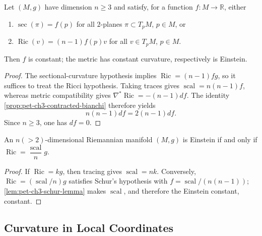\begin{lemma}
  \label{lem:pet-ch3-schur-lemma}
  \leanok
  Let $(M,g)$ have dimension $n\ge3$ and satisfy, for a function $f:M\to\mathbb
  R$, either
  \begin{enumerate}
    \item[(1)] $\sec(\pi)=f(p)$ for all $2$-planes $\pi\subset T_pM$, $p\in M$, or
    \item[(2)] $\operatorname{Ric}(v)=(n-1)f(p)v$ for all $v\in T_pM$, $p\in M$.
  \end{enumerate}
  Then $f$ is constant; the metric has constant curvature, respectively is
  Einstein.
\end{lemma}
\begin{proof}
  \leanok
  \sketch
  The sectional-curvature hypothesis implies
  $\operatorname{Ric}=(n-1)fg$, so it suffices to treat the Ricci hypothesis.
  Taking traces gives $\operatorname{scal}=n(n-1)f$, whereas metric compatibility
  gives $\nabla^*\operatorname{Ric}=-(n-1)df$.
  The identity \cref{prop:pet-ch3-contracted-bianchi} therefore yields
  \[
   n(n-1)df=2(n-1)df.
  \]
  Since $n\ge3$, one has $df=0$.
\end{proof}

\begin{corollary}
  \label{cor:pet-ch3-einstein-ricci-scalar-characterization}
  \leanok
  An $n(>2)$-dimensional Riemannian manifold $(M,g)$ is Einstein if and only if
  $\operatorname{Ric}=\dfrac{\operatorname{scal}}{n}g$.
\end{corollary}
\begin{proof}
  \leanok
  \sketch
  If $\operatorname{Ric}=kg$, then tracing gives
  $\operatorname{scal}=nk$. Conversely,
  $\operatorname{Ric}=(\operatorname{scal}/n)g$ satisfies Schur's hypothesis with
  $f=\operatorname{scal}/(n(n-1))$; \cref{lem:pet-ch3-schur-lemma} makes
  $\operatorname{scal}$, and therefore the Einstein constant, constant.
\end{proof}

\subsection{Curvature in Local Coordinates}

